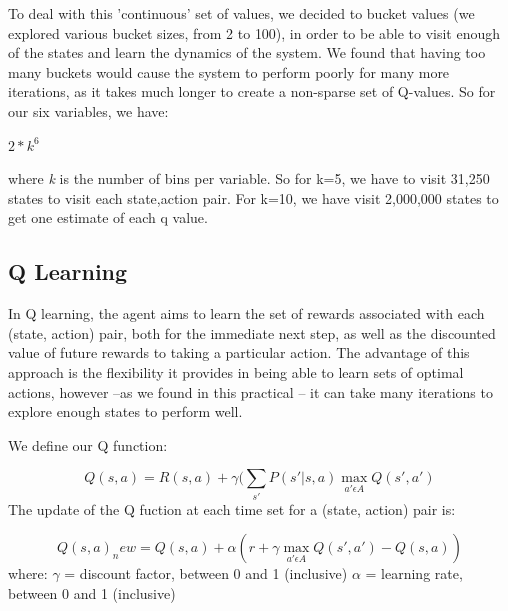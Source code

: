 \documentclass[11pt, oneside]{article}   	%
\begin{document}
To deal with this 'continuous' set of values, we decided to bucket values (we explored various bucket sizes, from 2 to 100), in order to be able to visit enough of the states and learn the dynamics of the system. We found that having too many buckets would cause the system to perform poorly for many more iterations, as it takes much longer to create a non-sparse set of Q-values. So for our six variables, we have:
\newline
\begin{center}
{$2*k^{6}$} 
\end{center}
where \textit{k} is the number of bins per variable. So for k=5, we have to visit 31,250 states to visit each state,action pair. For k=10, we have visit 2,000,000 states to get one estimate of each q value.

\subsection*{Q Learning}

In Q learning, the agent aims to learn the set of rewards associated with each (state, action) pair, both for the immediate next step, as well as the discounted value of future rewards to taking a particular action.
\newline 
The advantage of this approach is the flexibility it provides in being able to learn sets of optimal actions, however --as we found in this practical -- it can take many iterations to explore enough states to perform well.

We define our Q function:
\newline

\begin{equation}\label{reio}
Q(s,a) = R(s,a) +  \gamma (\sum_{s \prime} P(s\prime | s, a) \max_{a\prime \epsilon A} Q(s \prime, a \prime)
\end{equation}
\newline
The update of the Q fuction at each time set for a (state, action) pair is:

\begin{equation}\label{reio}
Q(s,a)_new = Q(s,a) +  \alpha (r + \gamma \max_{a\prime \epsilon A} Q(s \prime, a \prime) - Q(s,a))
\end{equation}
\newline
where:
\newline
$\gamma$ = discount factor, between 0 and 1 (inclusive)
\newline
$\alpha$ = learning rate, between 0 and 1 (inclusive)
\newline
\end{document}
